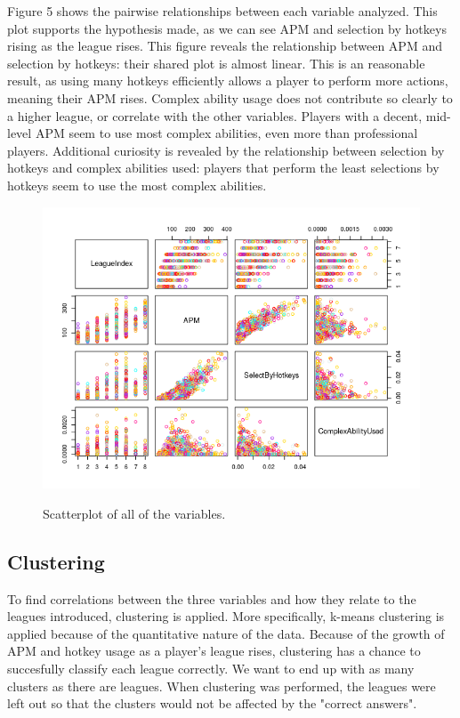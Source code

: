 \documentclass{article}
\begin{document}
Figure 5 shows the pairwise relationships between each variable analyzed. This plot supports the hypothesis made, as we can see APM and selection by hotkeys rising as the league rises. This figure reveals the relationship between APM and selection by hotkeys: their shared plot is almost linear. This is an reasonable result, as using many hotkeys efficiently allows a player to perform more actions, meaning their APM rises. Complex ability usage does not contribute so clearly to a higher league, or correlate with the other variables. Players with a decent, mid-level APM seem to use most complex abilities, even more than professional players. Additional curiosity is revealed by the relationship between selection by hotkeys and complex abilities used: players that perform the least selections by hotkeys seem to use the most complex abilities.

\begin{figure}[H]
    \centering
    \includegraphics[width=\textwidth]{variables.png}
    \label{figure:variables}
    \caption{Scatterplot of all of the variables.}
\end{figure}

\subsection{Clustering}
To find correlations between the three variables and how they relate to the leagues introduced, clustering is applied. More specifically, k-means clustering is applied because of the quantitative nature of the data. Because of the growth of APM and hotkey usage as a player's league rises, clustering has a chance to succesfully classify each league correctly. We want to end up with as many clusters as there are leagues. When clustering was performed, the leagues were left out so that the clusters would not be affected by the "correct answers".
\end{document}
